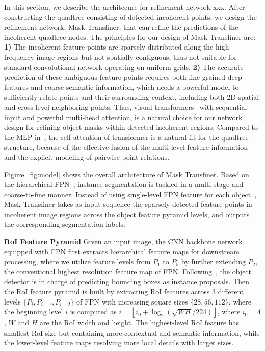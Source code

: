 \documentclass[10pt,twocolumn,letterpaper]{article}
\newcommand{\parsection}[1]{\vspace{1mm}\noindent\textbf{#1}}
\begin{document}
In this section, we describe the architecure for refinement network xxx.
After constructing the quadtree consisting of detected incoherent points, we design the refinement network, Mask Transfiner, that can refine the predictions of the incoherent quadtree nodes. The principles for our design of Mask Transfiner are: \textbf{1)} The incoherent feature points are sparsely distributed along the high-frequency image regions but not spatially contiguous, thus not suitable for standard convolutional network operating on uniform grids. \textbf{2)} The accurate prediction of these ambiguous feature points requires both fine-grained deep features and coarse semantic information, which needs a powerful model to sufficiently relate points and their surrounding context, including both 2D spatial and cross-level neighboring points. Thus, visual transformers~\cite{vaswani2017attention} with sequential input and powerful multi-head attention, is a natural choice for our network design for refining object masks within detected incoherent regions.
Compared to the MLP in~\cite{kirillov2020pointrend}, the self-attention of transformer is a natural fit for the quadtree structure, because of the effective fusion of the multi-level feature information and the explicit modeling of pairwise point relations. 

Figure~\ref{fig:model} shows the overall architecture of Mask Transfiner. Based on the hierarchical FPN~\cite{lin2017feature}, instance segmentation is tackled in a multi-stage and coarse-to-fine manner. Instead of using single-level FPN feature for each object~\cite{he2017mask}, Mask Transfiner takes as input sequence the sparsely detected feature points in incoherent image regions across the object feature pyramid levels, and outputs the corresponding segmentation labels.

\parsection{RoI Feature Pyramid} Given an input image, the CNN backbone network equipped with FPN first extracts hierarchical feature maps for downstream processing, where we utilize feature levels from $P_1$ to $P_5$ by further extending $P_2$, the conventional highest resolution feature map of FPN. Following~\cite{he2017mask, dong2021solq}, the object detector is in charge of predicting bounding boxes as instance proposals. Then the RoI feature pyramid is built by extracting RoI features across 3 different levels $\{P_i, P_{i-1}, P_{i-2}\}$ of FPN with increasing square sizes $\{28, 56, 112\}$, where the beginning level $i$ is computed as $i = \left \lfloor i_0 + \log_{2}(\sqrt{WH}/224) \right \rfloor$, where $i_{0} = 4$, $W$ and $H$ are the RoI width and height. The highest-level RoI feature has smallest RoI size but containing more contextual and semantic information, while the lower-level feature maps resolving more local details with larger sizes.
\end{document}
